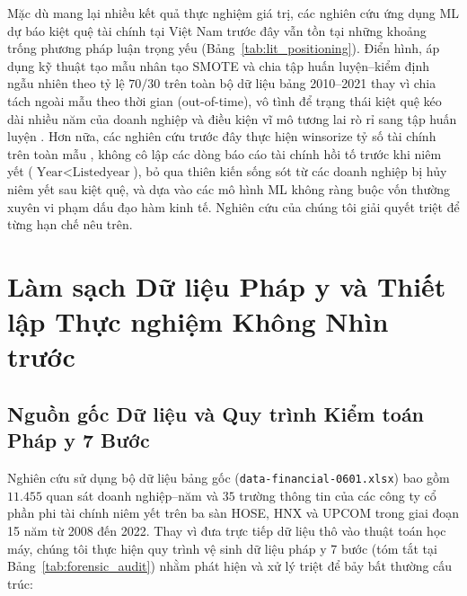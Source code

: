 \documentclass[11pt,a4paper]{article}
\begin{document}
Mặc dù mang lại nhiều kết quả thực nghiệm giá trị, các nghiên cứu ứng dụng ML dự báo kiệt quệ tài chính tại Việt Nam trước đây vẫn tồn tại những khoảng trống phương pháp luận trọng yếu (Bảng~\ref{tab:lit_positioning}). Điển hình, \citet{tran2022explainable} áp dụng kỹ thuật tạo mẫu nhân tạo SMOTE và chia tập huấn luyện--kiểm định ngẫu nhiên theo tỷ lệ $70/30$ trên toàn bộ dữ liệu bảng 2010--2021 thay vì chia tách ngoài mẫu theo thời gian (out-of-time), vô tình để trạng thái kiệt quệ kéo dài nhiều năm của doanh nghiệp và điều kiện vĩ mô tương lai rò rỉ sang tập huấn luyện \citep{bailey2014pseudo,lopez2018advances}. Hơn nữa, các nghiên cứu trước đây thực hiện winsorize tỷ số tài chính trên toàn mẫu \citep[ví dụ:][]{tran2023examining}, không cô lập các dòng báo cáo tài chính hồi tố trước khi niêm yết ($\text{Year} < \text{Listedyear}$), bỏ qua thiên kiến sống sót từ các doanh nghiệp bị hủy niêm yết sau kiệt quệ, và dựa vào các mô hình ML không ràng buộc vốn thường xuyên vi phạm dấu đạo hàm kinh tế. Nghiên cứu của chúng tôi giải quyết triệt để từng hạn chế nêu trên.

\section{Làm sạch Dữ liệu Pháp y và Thiết lập Thực nghiệm Không Nhìn trước}
\label{sec:data}

\subsection{Nguồn gốc Dữ liệu và Quy trình Kiểm toán Pháp y 7 Bước}
Nghiên cứu sử dụng bộ dữ liệu bảng gốc (\texttt{data-financial-0601.xlsx}) bao gồm $11.455$ quan sát doanh nghiệp--năm và $35$ trường thông tin của các công ty cổ phần phi tài chính niêm yết trên ba sàn HOSE, HNX và UPCOM trong giai đoạn 15 năm từ 2008 đến 2022. Thay vì đưa trực tiếp dữ liệu thô vào thuật toán học máy, chúng tôi thực hiện quy trình vệ sinh dữ liệu pháp y 7 bước (tóm tắt tại Bảng~\ref{tab:forensic_audit}) nhằm phát hiện và xử lý triệt để bảy bất thường cấu trúc:
\end{document}
